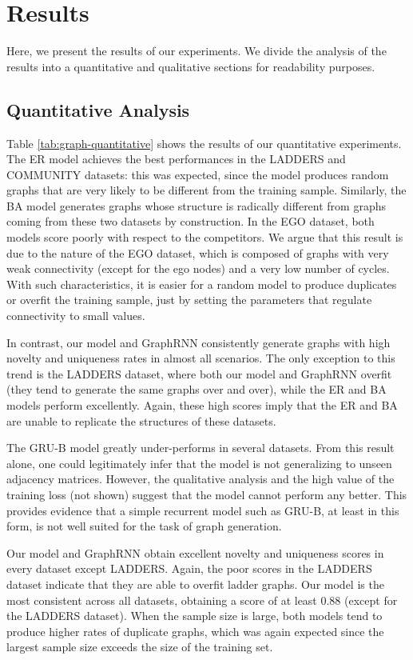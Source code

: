 \section{Results}
Here, we present the results of our experiments. We divide the analysis of the results into a quantitative and qualitative sections for readability purposes.

\subsection{Quantitative Analysis}
Table \ref{tab:graph-quantitative} shows the results of our quantitative experiments. The ER model achieves the best performances in the LADDERS and COMMUNITY datasets: this was expected, since the model produces random graphs that are very likely to be different from the training sample. Similarly, the BA model generates graphs whose structure is radically different from graphs coming from these two datasets by construction. In the EGO dataset, both models score poorly with respect to the competitors. We argue that this result is due to the nature of the EGO dataset, which is composed of graphs with very weak connectivity (except for the ego nodes) and a very low number of cycles. With such characteristics, it is easier for a random model to produce duplicates or overfit the training sample, just by setting the parameters that regulate connectivity to small values.

In contrast, our model and GraphRNN consistently generate graphs with high novelty and uniqueness rates in almost all scenarios. The only exception to this trend is the LADDERS dataset, where both our model and GraphRNN overfit (they tend to generate the same graphs over and over), while the ER and BA models perform excellently. Again, these high scores imply that the ER and BA are unable to replicate the structures of these datasets.

The GRU-B model greatly under-performs in several datasets. From this result alone, one could legitimately infer that the model is not generalizing to unseen adjacency matrices. However, the qualitative analysis and the high value of the training loss (not shown) suggest that the model cannot perform any better. This provides evidence that a simple recurrent model such as GRU-B, at least in this form, is not well suited for the task of graph generation.

Our model and GraphRNN obtain excellent novelty and uniqueness scores in every dataset except LADDERS. Again, the poor scores in the LADDERS dataset indicate that they are able to overfit ladder graphs. Our model is the most consistent across all datasets, obtaining a score of at least 0.88 (except for the LADDERS dataset). When the sample size is large, both models tend to produce higher rates of duplicate graphs, which was again expected since the largest sample size exceeds the size of the training set.


